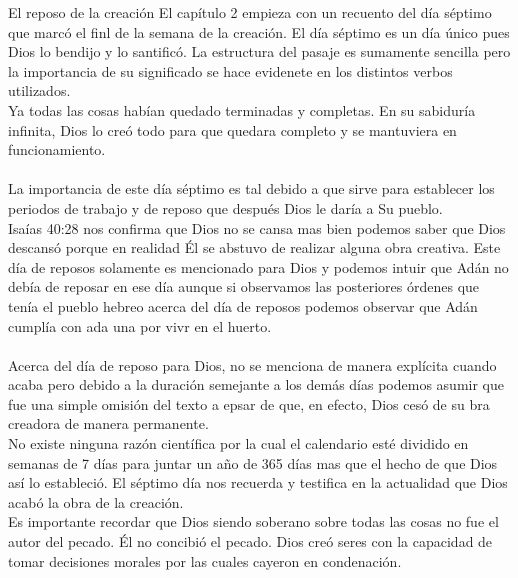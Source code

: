 \begin{section}{El reposo de la creación}
	El capítulo 2 empieza con un recuento del día séptimo que marcó el finl de la semana de la creación. El día séptimo es un día único pues Dios lo bendijo y lo santificó. La estructura del pasaje es sumamente sencilla pero la importancia de su significado se hace evidenete en los distintos verbos utilizados.\\
	Ya todas las cosas habían quedado terminadas y completas. En su sabiduría infinita, Dios lo creó todo para que quedara completo y se mantuviera en funcionamiento.\\
	\\
	La importancia de este día séptimo es tal debido a que sirve para establecer los periodos de trabajo y de reposo que después Dios le daría a Su pueblo.\\
	Isaías 40:28 nos confirma que Dios no se cansa mas bien podemos saber que Dios descansó porque en realidad Él se abstuvo de realizar alguna obra creativa. Este día de reposos solamente es mencionado para Dios y podemos intuir que Adán no debía de reposar en ese día aunque si observamos las posteriores órdenes que tenía el pueblo hebreo acerca del día de reposos podemos observar que Adán cumplía con ada una por vivr en el huerto.\\
	\\
	Acerca del día de reposo para Dios, no se menciona de manera explícita cuando acaba pero debido a la duración semejante a los demás días podemos asumir que fue una simple omisión del texto a epsar de que, en efecto, Dios cesó de su bra creadora de manera permanente.\\
	No existe ninguna razón científica por la cual el calendario esté dividido en semanas de 7 días para juntar un año de 365 días mas que  el hecho de que Dios así lo estableció. El séptimo día nos recuerda y testifica en la actualidad que Dios acabó la obra de la creación.\\
	Es importante recordar que Dios siendo soberano  sobre todas las cosas no fue el autor del pecado. Él no concibió el pecado. Dios creó seres con la capacidad de tomar decisiones morales por las cuales cayeron en condenación.\\
\end{section}
\newpage
